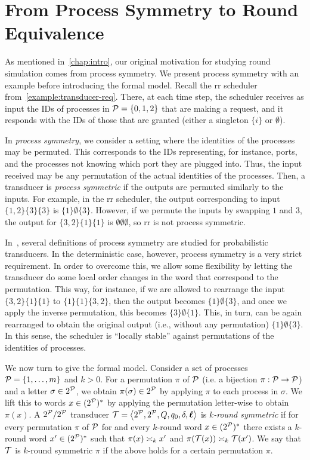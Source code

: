 \chapter{From Process Symmetry to Round Equivalence}
\label{chap:application}

As mentioned in~\cref{chap:intro}, our original motivation for studying round simulation comes from process symmetry. We present process symmetry with an example before introducing the formal model.
Recall the \gls{rr} scheduler from~\cref{example:transducer-req}. There, at each time step, the scheduler receives as input the IDs of processes in $\cP=\{0,1,2\}$ that are making a request, and it responds with the IDs of those that are granted (either a singleton $\{i\}$ or $\emptyset$).

In \emph{process symmetry}, we consider a setting where the identities of the processes may be permuted. This corresponds to the IDs representing, for instance, ports, and the processes not knowing which port they are plugged into. Thus, the input received may be any permutation of the actual identities of the processes. Then, a transducer is \emph{process symmetric} if the outputs are permuted similarly to the inputs. For example, in the \gls{rr} scheduler, the output corresponding to input $\{1,2\}\{3\}\{3\}$ is $\{1\}\emptyset\{3\}$. However, if we permute the inputs by swapping $1$ and $3$, the output for $\{3,2\}\{1\}\{1\}$ is $\emptyset\emptyset\emptyset$, so \gls{rr} is not process symmetric.

In~\cite{Almagor2020b}, several definitions of process symmetry are studied for probabilistic transducers. In the deterministic case, however, process symmetry is a very strict requirement. In order to overcome this, we allow some flexibility by letting the transducer do some local order changes in the word that correspond to the permutation. This way, for instance, if we are allowed to rearrange the input $\{3,2\}\{1\}\{1\}$ to $\{1\}\{1\}\{3,2\}$, then the output becomes $\{1\}\emptyset\{3\}$, and once we apply the inverse permutation, this becomes $\{3\}\emptyset\{1\}$. This, in turn, can be again rearranged to obtain the original output (i.e., without any permutation) $\{1\}\emptyset\{3\}$.
In this sense, the scheduler is ``locally stable'' against permutations of the identities of processes.

We now turn to give the formal model.
Consider a set of processes $\cP=\{1,\dots,m\}$ and $k>0$. For a permutation $\pi$ of $\cP$ (i.e. a bijection $\pi:\cP\to \cP$) and a letter $\sigma\in 2^{\cP}$, we obtain $\pi(\sigma)\in 2^{\cP}$ by applying $\pi$ to each process in $\sigma$. We lift this to words $x\in (2^{\cP})^*$ by applying the permutation letter-wise to obtain $\pi(x)$.
A $2^\cP/2^\cP$ transducer $\cT=\tup{2^\cP,2^\cP,Q,q_0,\delta,\lab}$ is \emph{$k$-round symmetric} if for every permutation $\pi$ of $\cP$ for and every $k$-round word $x\in (2^{\cP})^*$ there exists a $k$-round word $x' \in (2^{\cP})^*$ such that $\pi(x)\req[k] x'$ and $\pi(\cT(x))\req[k] \cT(x')$.
We say that $\cT$ is $k$-round symmetric \WRT $\pi$ if the above holds for a certain permutation $\pi$.

